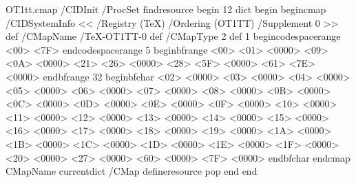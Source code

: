 \newcommand{\cref}[1]{Chapter~\ref{#1}}
\newcommand{\sref}[1]{Section~\ref{#1}}
\newcommand{\fref}[1]{Figure~\ref{#1}}
\newcommand{\tref}[1]{Table~\ref{#1}}
\newcommand{\lref}[1]{Listing~\ref{#1}}
\newcommand{\eref}[1]{Equation~\ref{#1}}

\begin{VerbatimOut}{OT1tt.cmap}
/CIDInit /ProcSet findresource begin
12 dict begin
begincmap
/CIDSystemInfo
<< /Registry (TeX)
/Ordering (OT1TT)
/Supplement 0
>> def
/CMapName /TeX-OT1TT-0 def
/CMapType 2 def
1 begincodespacerange
<00> <7F>
endcodespacerange
5 beginbfrange
<00> <01> <0000>
<09> <0A> <0000>
<21> <26> <0000>
<28> <5F> <0000>
<61> <7E> <0000>
endbfrange
32 beginbfchar
<02> <0000>
<03> <0000>
<04> <0000>
<05> <0000>
<06> <0000>
<07> <0000>
<08> <0000>
<0B> <0000>
<0C> <0000>
<0D> <0000>
<0E> <0000>
<0F> <0000>
<10> <0000>
<11> <0000>
<12> <0000>
<13> <0000>
<14> <0000>
<15> <0000>
<16> <0000>
<17> <0000>
<18> <0000>
<19> <0000>
<1A> <0000>
<1B> <0000>
<1C> <0000>
<1D> <0000>
<1E> <0000>
<1F> <0000>
<20> <0000>
<27> <0000>
<60> <0000>
<7F> <0000>
endbfchar
endcmap
CMapName currentdict /CMap defineresource pop
end
end

\end{VerbatimOut}
  
  

\usepackage[resetfonts]{cmap}